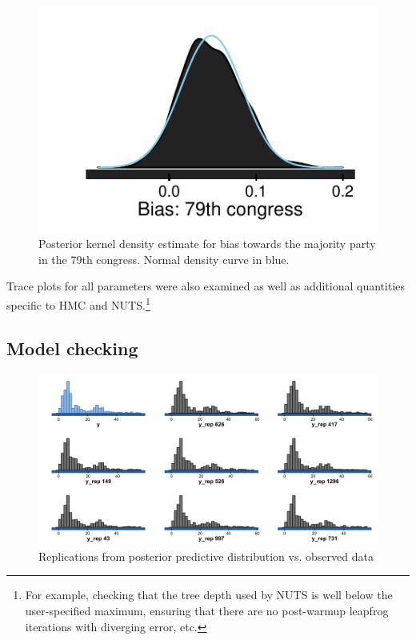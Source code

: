 \begin{figure}[h]
\centering
	\includegraphics[scale=0.75]{sections/figs/example_posterior}
\caption{Posterior kernel density estimate for bias towards the majority party in the 79th congress. Normal density curve in blue.}
\label{fig:ck_example_posterior}
\end{figure}




Trace plots for all parameters were also examined as well as additional quantities specific to HMC and NUTS.\footnote{For example, checking that the tree depth used by NUTS is well below the user-specified maximum, ensuring that there are no post-warmup leapfrog iterations with diverging error, etc.}

\subsection{Model checking}
\label{subsection_model_checking}



\begin{figure}
\centering
	\includegraphics[scale=0.25]{sections/figs/ck_pp_hists}
\caption{Replications from posterior predictive distribution vs. observed data}
\label{fig:ck_pp_hists}
\end{figure}

